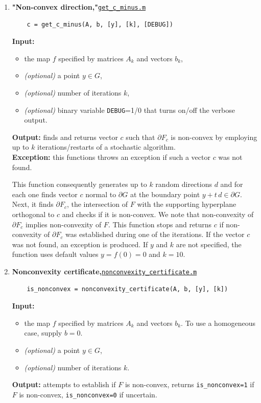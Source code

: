 \documentclass[a4paper]{article}
\theoremstyle{definition}
\begin{document}
\begin{enumerate}
\item {\bf "Non-convex direction,"\hskip 6pt}\underline{\tt  get\_c\_minus.m} 
	\begin{verbatim}
	c = get_c_minus(A, b, [y], [k], [DEBUG])
	\end{verbatim}
{\bf Input:}
\begin{itemize}
	\item the map $f$ specified by matrices $A_k$ and vectors $b_k$,
	\item {\it (optional)} a point $y\in G$,
	\item {\it (optional)} number of iterations $k$,
	\item {\it (optional)} binary variable {\tt DEBUG}=1/0 that turns on/off the verbose output.
\end{itemize}
{\bf Output:}  finds and returns vector $c$ such that $\partial F_c$ is non-convex by employing up to $k$ iterations/restarts of a stochastic algorithm.\\
{\bf Exception:} this functions throws an exception if such a vector $c$ was not found.

This function consequently generates up to $k$ random directions $d$ and for each one finds vector $c$ normal to $\partial G$ at the boundary point $y+t\, d\in \partial G$.
Next, it finds $\partial F_c$, the intersection of $F$ with the supporting hyperplane orthogonal to $c$ and checks if it is non-convex.
We note that non-convexity of $\partial F_c$ implies non-convexity of $F$.
This function stops and returns $c$ if non-convexity of $\partial F_c$ was established during one of the iterations. If the vector $c$ was not found, an exception is produced.
If $y$ and $k$ are not specified, the function uses default values $y=f(0)=0$ and $k=10$.


\item {\bf Nonconvexity certificate,\hskip 6pt}\underline{\tt  nonconvexity\_certificate.m} 
	\begin{verbatim}
	is_nonconvex = nonconvexity_certificate(A, b, [y], [k])
	\end{verbatim}
{\bf Input:}
\begin{itemize}
	\item the map $f$ specified by matrices $A_k$ and vectors $b_k$. To use a homogeneous case, supply $b=0$.
	\item {\it (optional)} a point $y\in G$,
	\item {\it (optional)} number of iterations $k$.
\end{itemize}
{\bf Output:} attempts to establish if $F$ is non-convex, returns {\tt is\_nonconvex=1} if $F$ is non-convex,  {\tt is\_nonconvex=0} if uncertain.\\


\end{enumerate}
\end{document}

